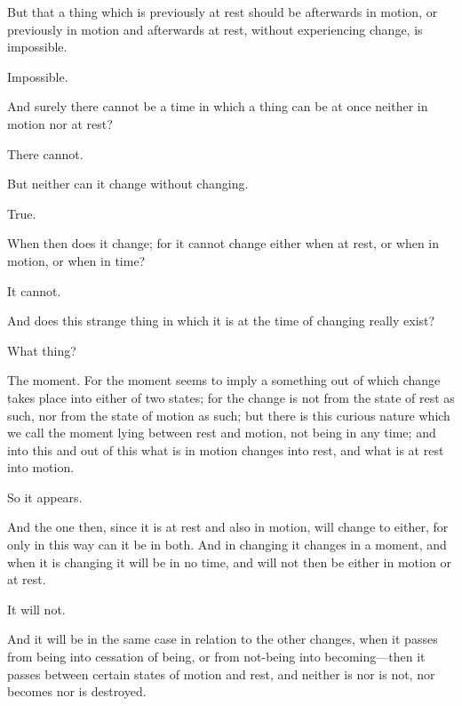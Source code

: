 \documentclass[11pt,letter]{article}
\begin{document}
\par  But that a thing which is previously at rest should be afterwards in motion, or previously in motion and afterwards at rest, without experiencing change, is impossible.

\par  Impossible.

\par  And surely there cannot be a time in which a thing can be at once neither in motion nor at rest?

\par  There cannot.

\par  But neither can it change without changing.

\par  True.

\par  When then does it change; for it cannot change either when at rest, or when in motion, or when in time?

\par  It cannot.

\par  And does this strange thing in which it is at the time of changing really exist?

\par  What thing?

\par  The moment. For the moment seems to imply a something out of which change takes place into either of two states; for the change is not from the state of rest as such, nor from the state of motion as such; but there is this curious nature which we call the moment lying between rest and motion, not being in any time; and into this and out of this what is in motion changes into rest, and what is at rest into motion.

\par  So it appears.

\par  And the one then, since it is at rest and also in motion, will change to either, for only in this way can it be in both. And in changing it changes in a moment, and when it is changing it will be in no time, and will not then be either in motion or at rest.

\par  It will not.

\par  And it will be in the same case in relation to the other changes, when it passes from being into cessation of being, or from not-being into becoming—then it passes between certain states of motion and rest, and neither is nor is not, nor becomes nor is destroyed.
\end{document}
